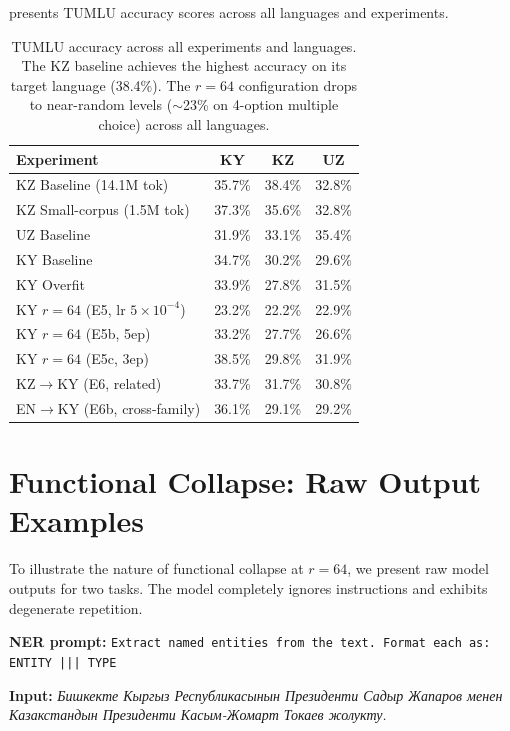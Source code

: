 \documentclass[11pt]{article}
\begin{document}
 presents TUMLU accuracy scores across all languages and experiments.

\begin{table}[t]
\centering
\small
\begin{tabular}{lccc}
\toprule
\textbf{Experiment} & \textbf{KY} & \textbf{KZ} & \textbf{UZ} \\
\midrule
KZ Baseline (14.1M tok) & 35.7\% & 38.4\% & 32.8\% \\
KZ Small-corpus (1.5M tok) & 37.3\% & 35.6\% & 32.8\% \\
UZ Baseline & 31.9\% & 33.1\% & 35.4\% \\
KY Baseline & 34.7\% & 30.2\% & 29.6\% \\
KY Overfit & 33.9\% & 27.8\% & 31.5\% \\
KY $r{=}64$ (E5, lr $5{\times}10^{-4}$) & 23.2\% & 22.2\% & 22.9\% \\
KY $r{=}64$ (E5b, 5ep) & 33.2\% & 27.7\% & 26.6\% \\
KY $r{=}64$ (E5c, 3ep) & 38.5\% & 29.8\% & 31.9\% \\
KZ$\rightarrow$KY (E6, related) & 33.7\% & 31.7\% & 30.8\% \\
EN$\rightarrow$KY (E6b, cross-family) & 36.1\% & 29.1\% & 29.2\% \\
\bottomrule
\end{tabular}
\caption{TUMLU accuracy across all experiments and languages. The KZ baseline achieves the highest accuracy on its target language (38.4\%). The $r{=}64$ configuration drops to near-random levels ($\sim$23\% on 4-option multiple choice) across all languages.}
\label{tab:tumlu_full}
\end{table}

\section{Functional Collapse: Raw Output Examples}
\label{app:collapse_examples}

To illustrate the nature of functional collapse at $r{=}64$, we present raw model outputs for two tasks. The model completely ignores instructions and exhibits degenerate repetition.

\textbf{NER prompt:} \texttt{Extract named entities from the text. Format each as: ENTITY ||| TYPE}

\textbf{Input:} {\cyrfont\textit{Бишкекте Кыргыз Республикасынын Президенти Садыр Жапаров менен Казакстандын Президенти Касым-Жомарт Токаев жолукту.}}
\end{document}
